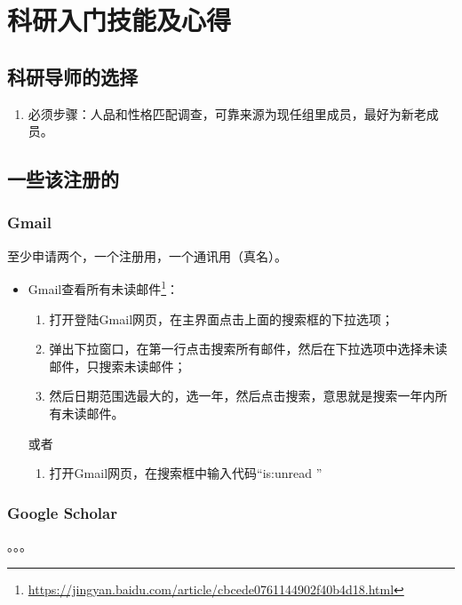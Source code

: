 



\chapter{科研入门技能及心得}
\section{科研导师的选择}
\begin{enumerate}
\item 必须步骤：人品和性格匹配调查，可靠来源为现任组里成员，最好为新老成员。
\end{enumerate}



\section{一些该注册的}
\subsection{Gmail}
 至少申请两个，一个注册用，一个通讯用（真名）。

\begin{itemize}
\item Gmail查看所有未读邮件\footnote{\url{https://jingyan.baidu.com/article/cbcede0761144902f40b4d18.html}}：
\begin{enumerate}
\item 打开登陆Gmail网页，在主界面点击上面的搜索框的下拉选项；
\item 弹出下拉窗口，在第一行点击搜索所有邮件，然后在下拉选项中选择未读邮件，只搜索未读邮件；
\item 然后日期范围选最大的，选一年，然后点击搜索，意思就是搜索一年内所有未读邮件。
\end{enumerate}
或者
\begin{enumerate}
\item 打开Gmail网页，在搜索框中输入代码“is:unread ”
\end{enumerate}
\end{itemize}



\subsection{Google Scholar}
。。。

